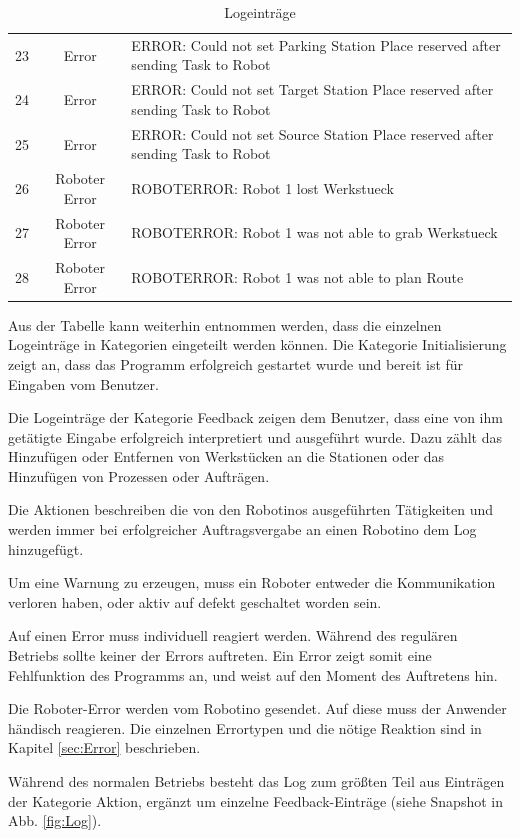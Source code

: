 \begin{table}[!ht]
\begin{tabular}{|c|c|p{10cm}|}
    23 & Error & ERROR: Could not set Parking Station Place reserved after sending Task to Robot \\
    24 & Error & ERROR: Could not set Target Station Place reserved after sending Task to Robot \\
    25 & Error & ERROR: Could not set Source Station Place reserved after sending Task to Robot \\
		\hline
    26 & Roboter Error & ROBOTERROR: Robot 1 lost Werkstueck \\
    27 & Roboter Error & ROBOTERROR: Robot 1 was not able to grab Werkstueck \\
    28 & Roboter Error & ROBOTERROR: Robot 1 was not able to plan Route \\
		\hline
	\end{tabular}
	\caption{Logeinträge}
	\label{tab:Log}
\end{table}

Aus der Tabelle kann weiterhin entnommen werden, dass die einzelnen Logeinträge in Kategorien eingeteilt werden können. Die Kategorie Initialisierung zeigt an, dass das Programm erfolgreich gestartet wurde und bereit ist für Eingaben vom Benutzer. 

Die Logeinträge der Kategorie Feedback zeigen dem Benutzer, dass eine von ihm getätigte Eingabe erfolgreich interpretiert und ausgeführt wurde. Dazu zählt das Hinzufügen oder Entfernen von Werkstücken an die Stationen oder das Hinzufügen von Prozessen oder Aufträgen. 

Die Aktionen beschreiben die von den Robotinos ausgeführten Tätigkeiten und werden immer bei erfolgreicher Auftragsvergabe an einen Robotino dem Log hinzugefügt. 

Um eine Warnung zu erzeugen, muss ein Roboter entweder die Kommunikation verloren haben, oder aktiv auf defekt geschaltet worden sein. 

Auf einen Error muss individuell reagiert werden. Während des regulären Betriebs sollte keiner der Errors auftreten. Ein Error zeigt somit eine Fehlfunktion des Programms an, und weist auf den Moment des Auftretens hin.

Die Roboter-Error werden vom Robotino gesendet. Auf diese muss der Anwender händisch reagieren. Die einzelnen Errortypen und die nötige Reaktion sind in Kapitel \ref{sec:Error} beschrieben. 

Während des normalen Betriebs besteht das Log zum größten Teil aus Einträgen der Kategorie Aktion, ergänzt um einzelne Feedback-Einträge (siehe Snapshot in Abb. \ref{fig:Log}).  

